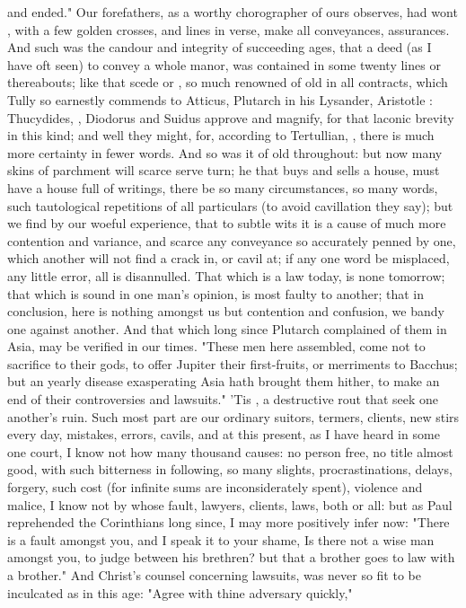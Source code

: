 and ended." Our forefathers, as a worthy chorographer of
ours observes, had wont , with a few golden
crosses, and lines in verse, make all conveyances, assurances. And such was the
candour and integrity of succeeding ages, that a deed (as I have oft seen) to
convey a whole manor, was  contained in some twenty lines or
thereabouts; like that scede or , so much renowned of old
in all contracts, which Tully so earnestly commends to
Atticus, Plutarch in his Lysander, Aristotle :
Thucydides, , Diodorus and
Suidus approve and magnify, for that laconic brevity in this kind; and well
they might, for, according to Tertullian, , there is much more certainty in fewer words. And so was it of old
throughout: but now many skins of parchment will scarce serve turn; he that
buys and sells a house, must have a house full of writings, there be so many
circumstances, so many words, such tautological repetitions of all particulars
(to avoid cavillation they say); but we find by our woeful experience, that to
subtle wits it is a cause of much more contention and variance, and scarce any
conveyance so accurately penned by one, which another will not find a crack in,
or cavil at; if any one word be misplaced, any little error, all is
disannulled. That which is a law today, is none tomorrow; that which is sound
in one man's opinion, is most faulty to another; that in conclusion, here is
nothing amongst us but contention and confusion, we bandy one against another.
And that which long since Plutarch complained of them in
Asia, may be verified in our times. "These men here assembled, come not to
sacrifice to their gods, to offer Jupiter their first-fruits, or merriments to
Bacchus; but an yearly disease exasperating Asia hath brought them hither, to
make an end of their controversies and lawsuits." 'Tis , a destructive rout that seek one another's ruin. Such most part
are our ordinary suitors, termers, clients, new stirs every day, mistakes,
errors, cavils, and at this present, as I have heard in some one court, I know
not how many thousand causes: no person free, no title almost good, with such
bitterness in following, so many slights, procrastinations, delays, forgery,
such cost (for infinite sums are inconsiderately spent), violence and malice, I
know not by whose fault, lawyers, clients, laws, both or all: but as Paul
reprehended the Corinthians long since, I may more
positively infer now: "There is a fault amongst you, and I speak it to your
shame, Is there not a wise man amongst you, to judge
between his brethren? but that a brother goes to law with a brother." And
Christ's counsel concerning lawsuits, was never so fit to
be inculcated as in this age: "Agree with thine adversary
quickly," \etc{} 

